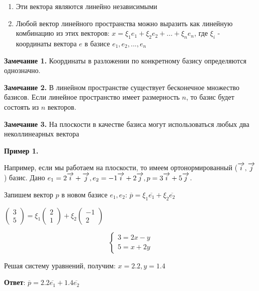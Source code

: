 \documentclass{article}
\def\vec{\ensuremath\overrightarrow}
\begin{document}
\begin{flushleft}
\begin{enumerate}
    \item Эти вектора являются линейно независимыми
    \item Любой вектор линейного пространства можно выразить как линейную комбинацию из этих векторов: $x = \xi_1 e_1 + \xi_2 e_2 + ... + \xi_n e_n$, где $\xi_i$ - координаты вектора $e$ в базисе $e_1,e_2,...,e_n$
\end{enumerate}

\textbf{Замечание 1. } Координаты в разложении по конкретному базису определяются однозначно.

\textbf{Замечание 2. } В линейном пространстве существует бесконечное множество базисов. Если линейное пространство имеет размерность $n$, то базис будет состоять из $n$ векторов.

\textbf{Замечание 3.} На плоскости в качестве базиса могут использоваться любых два неколлинеарных вектора

\hfill

\textbf{Пример 1.}
\hfill

Например, если мы работаем на плоскости, то имеем ортонормированный ($\vec{i}, \vec{j}$) базис. Дано $e_1 = 2 \vec{i} + \vec{j}, e_2 = -1\vec{i} + 2\vec{j}, p = 3\vec{i} + 5\vec{j}$.

Запишем вектор $p$ в новом базисе $e_1, e_2$: $\overline{p} = \xi_1 \overline{e_1} + \xi_2 \overline{e_2}$

\hfill

$\begin{pmatrix}
    3 \\
    5
\end{pmatrix} = \xi_1 \begin{pmatrix}
    2 \\
    1
\end{pmatrix} + \xi_2 \begin{pmatrix}
    -1 \\
    2
\end{pmatrix}$

\begin{equation}
    \begin{cases}
        3 = 2x - y \\
        5 = x + 2y
    \end{cases}
\end{equation}

Решая систему уравнений, получим: $x = 2.2, y = 1.4$

\hfill

\textbf{Ответ}: $\overline{p} = 2.2 \overline{e_1} + 1.4 \overline{e_2}$


\end{flushleft}
\end{document}
